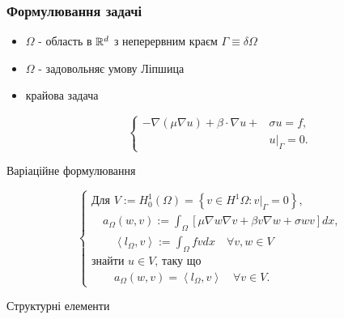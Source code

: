 
\newcommand{\vonenorm}{\left|v\right|_{1,\Omega}}
\newcommand{\infnorm}[1]{\norm{#1}_\infty}

\begin{frame}[allowframebreaks]
	\frametitle<presentation>{Формулювання задачі}

		 \begin{itemize}
		 	\item $\Omega$ - область в $\mathbb{R}^d$ з неперервним краєм $\Gamma \equiv \delta \Omega$
		 	\item $\Omega$ - задовольняє умову Ліпшица
		 	\item крайова задача

				 \begin{equation}\label{eq:general_boundary}
					\begin{cases}
							- \nabla (\mu \nabla u) + \beta \cdot \nabla u + &\sigma u = f,  \\
							&u|_\Gamma = 0.
					\end{cases}
				\end{equation}
		\end{itemize}
	\framebreak
		Варіаційне формулювання

		\begin{equation}\label{eq:general_variational}
			\begin{cases}
				\mbox{Для } V := H_0^1 \left( \Omega \right) =
				\left\lbrace
					v \in H^1 \Omega : v|_\Gamma = 0
				\right\rbrace, \\

				\quad a_\Omega(w,v) := \displaystyle\int_\Omega
				\left[
					\mu \nabla w \nabla v +\beta v \nabla w + \sigma wv
				\right] dx, \\

				\qquad \left\langle l_\Omega, v \right\rangle := \displaystyle\int_\Omega fvdx \quad \forall v,w \in V \\

				\mbox{знайти }u \in V \mbox{, таку що} \\

				\qquad a_\Omega(w,v) = \left\langle l_\Omega, v \right\rangle \quad \forall v \in V.

			\end{cases}
		\end{equation}

	\framebreak

		Структурні елементи


\end{frame}
